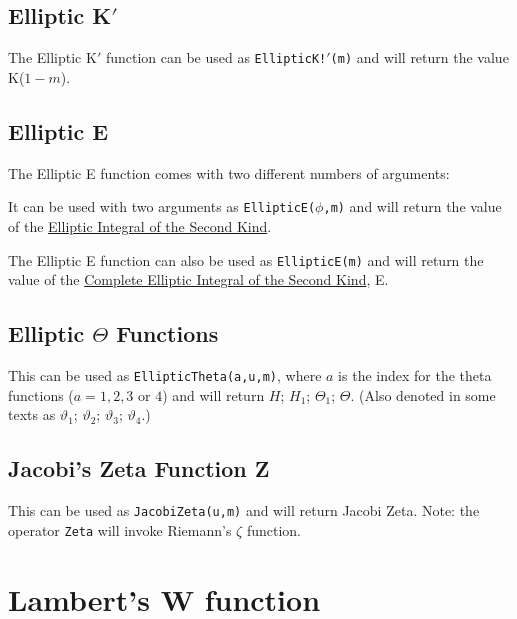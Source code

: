 \subsection{Elliptic K$'$}

The Elliptic K$'$ function can be used as {\tt EllipticK!$'$(m)} and will 
return the value K($1-m$).

\subsection{Elliptic E}

The Elliptic E function comes with two different numbers of arguments:

It can be used with two arguments as {\tt EllipticE($\phi$,m)}
and will return the value
of the {\underline {Elliptic Integral of the Second Kind}}.

The Elliptic E function can also be used as {\tt EllipticE(m)} and 
will return the value of the {\underline {Complete Elliptic Integral 
of the Second Kind}}, E.

%
%
\subsection{Elliptic $\Theta$ Functions}

This can be used as {\tt EllipticTheta(a,u,m)}, where $a$ is the index 
for the theta functions ($a = 1,2,3$ or $4$) and will return $H$; 
$H_1$; $\Theta_1$; $\Theta$. (Also denoted in some texts as 
$\vartheta_1$; $\vartheta_2$; $\vartheta_3$; $\vartheta_4$.)

\subsection{Jacobi's Zeta Function Z }

This can be used as {\tt JacobiZeta(u,m)} and will return 
Jacobi Zeta. Note: the operator {\tt Zeta} will invoke Riemann's
$\zeta$ function.

\section{Lambert's W function}

